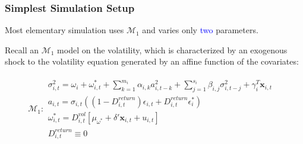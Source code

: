 \documentclass[9pt]{beamer}
\newcommand{\x}{\textbf{x}}
\def\mbf#1{\mathbf{#1}} %
\def\mc#1{\mathcal{#1}} %
\def\mc#1{\mathcal{#1}}
\theoremstyle{definition}
\begin{document}
\begin{frame}
\fontsize{8pt}{9pt}

\frametitle{Simplest Simulation Setup}

Most elementary simulation uses $\mc{M}_1$ and varies only \textcolor{blue}{two} parameters.\\

\bigbreak

Recall an \hyperlink{model_1}{$\mc{M}_1$} model on the volatility, which is characterized by an exogenous shock to the volatility equation generated by an affine function of the covariates:

  \begin{align*}
    \mc{M}_1 \colon \begin{array}{l}
       \sigma^{2}_{i,t} = \omega_{i} + \omega^{*}_{i,t} + \sum^{m_{i}}_{k=1}\alpha_{i,k}a^{2}_{i,t-k} + \sum_{j=1}^{s_{i}}\beta_{i,j}\sigma_{i,t-j}^{2} + \gamma_{i}^{T} \x_{i,t} \text{ }\\[.2cm]
       a_{i,t} = \sigma_{i,t}((1-D^{return}_{i,t})\epsilon_{i,t} + D^{return}_{i,t}\epsilon^{*}_{i})\\[.2cm]
      \omega_{i,t}^{*} = D^{vol}_{i,t}[\mu_{\omega^{*}}+\delta'\mbf{x}_{i, t}+ u_{i,t}]\\[.2cm]
      D^{return}_{i,t} \equiv 0
    \end{array}
    \end{align*}

\end{frame}
\end{document}
